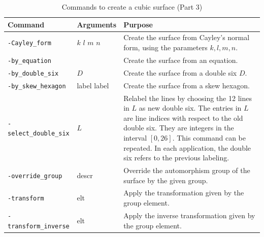 \begin{table}
\begin{center}
\begin{tabular}{|p{4cm}|p{3cm}|p{7cm}|}
\hline
Command & Arguments & Purpose \\
\hline
\hline
\verb'-Cayley_form' & $k$ $l$ $m$ $n$   & 
Create the surface from Cayley's normal form, using the parameters $k,l,m,n.$\\
\hline
\verb'-by_equation' &    & 
Create the surface from an equation.\\
\hline
\verb'-by_double_six' &  $D$  & 
Create the surface from a double six $D$.\\
\hline
\verb'-by_skew_hexagon' &  label label  & 
Create the surface from a skew hexagon.\\
\hline
\verb'-select_double_six' &  $L$   & 
Relabel the lines by choosing the 12 lines in $L$ as new double six. 
The entries in $L$ are line indices with respect to the old double six. 
They are integers in the interval $[0,26].$ 
This command can be repeated. 
In each application, the double six refers to the previous labeling. \\
\hline
\verb'-override_group' & descr & Override the automorphism group of the surface by the given group. \\
\hline
\verb'-transform' & elt & Apply the transformation given by the group element. \\
\hline
\verb'-transform_inverse' & elt & Apply the inverse transformation given by the group element. \\
\hline
\end{tabular}
\end{center}
\caption{\label{tab:createsurface:three}Commands to create a cubic surface (Part 3)}
\end{table}


